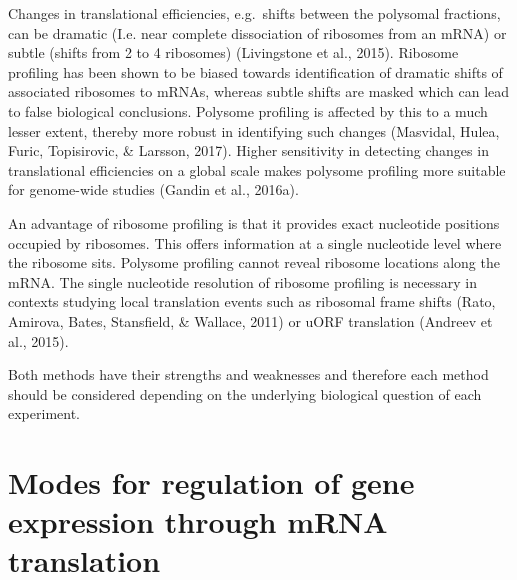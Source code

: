 \documentclass[12pt,openany]{book}
\begin{document}
Changes in translational efficiencies, e.g.~shifts between the polysomal
fractions, can be dramatic (I.e. near complete dissociation of ribosomes
from an mRNA) or subtle (shifts from 2 to 4 ribosomes) (Livingstone et
al., 2015). Ribosome profiling has been shown to be biased towards
identification of dramatic shifts of associated ribosomes to mRNAs,
whereas subtle shifts are masked which can lead to false biological
conclusions. Polysome profiling is affected by this to a much lesser
extent, thereby more robust in identifying such changes (Masvidal,
Hulea, Furic, Topisirovic, \& Larsson, 2017). Higher sensitivity in
detecting changes in translational efficiencies on a global scale makes
polysome profiling more suitable for genome-wide studies (Gandin et al.,
2016a).

An advantage of ribosome profiling is that it provides exact nucleotide
positions occupied by ribosomes. This offers information at a single
nucleotide level where the ribosome sits. Polysome profiling cannot
reveal ribosome locations along the mRNA. The single nucleotide
resolution of ribosome profiling is necessary in contexts studying local
translation events such as ribosomal frame shifts (Rato, Amirova, Bates,
Stansfield, \& Wallace, 2011) or uORF translation (Andreev et al.,
2015).

Both methods have their strengths and weaknesses and therefore each
method should be considered depending on the underlying biological
question of each experiment.

\section{Modes for regulation of gene expression through mRNA translation} \label{modes}
\end{document}
